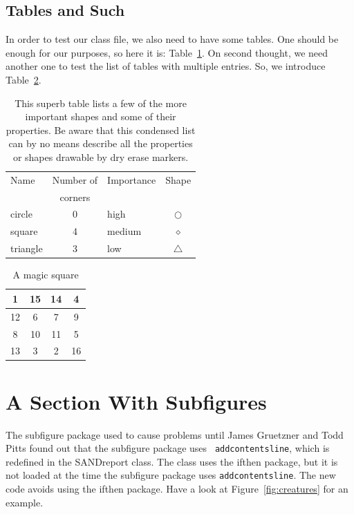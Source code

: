 \documentclass[pdf,ps2pdf,12pt]{smemo}
\begin{document}
\begin{memo}
\subsection{Tables and Such}
In order to test our class file, we also need to have some tables. One
should be enough for our purposes, so here it is: Table~\ref{tab1}. On
second thought, we need another one to test the list of tables with
multiple entries. So, we introduce Table~\ref{tab2}.

\begin{table}[ht]
  \centering
  \caption[Shapes]{This superb table lists a few
    of the more important shapes and some of
    their properties. Be aware that this condensed list
    can by no means describe all the properties or
    shapes drawable by dry erase markers.}
  \bigskip

  \begin{tabular}{|l|c|l|c|}
    \hline \hline
    Name  & Number of & Importance & Shape \\
    & corners   &            &       \\
    \hline
    circle & 0        & high       & $\bigcirc$ \\
    square & 4        & medium     & $\diamond$ \\
    triangle & 3      & low        & $\triangle$ \\
    \hline
  \end{tabular}
  \label{tab1}
\end{table}

\begin{table}[ht]
  \centering
  \caption{A magic square}
  \bigskip

  \begin{tabular}{|c|c|c|c|}
    \hline
    1 & 15 & 14 & 4 \\ \hline
    12 & 6 & 7 & 9 \\ \hline
    8 & 10 & 11 & 5 \\ \hline
    13 & 3 & 2 & 16 \\ \hline
  \end{tabular}
  \label{tab2}
\end{table}

\section{A Section With Subfigures}
The subfigure package used to cause problems until James Gruetzner and
Todd Pitts found out that the subfigure package uses {\tt
  addcontentsline}, which is redefined in the SANDreport class. The
class uses the ifthen package, but it is not loaded at the time the
subfigure package uses {\tt addcontentsline}.  The new code avoids
using the ifthen package.  Have a look at Figure~\ref{fig:creatures}
for an example.


\end{memo}
\end{document}
